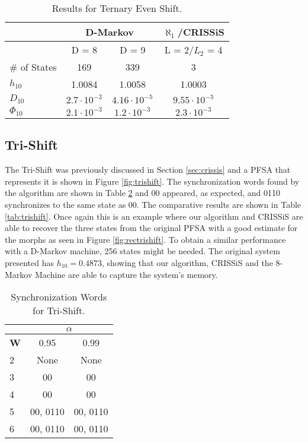 {\begin{table}
\centering
\caption{Results for Ternary Even Shift. \label{tab:ternaryeven}}
\begin{tabular}{|l|c|c|c|}
\hline
 & \multicolumn{2}{c|}{\textbf{D-Markov}} & \textbf{$\aleph_1$/CRISSiS}\\
 \hline
 & D = 8 & D = 9 &  L = 2/$L_2$ = 4 \\
\hline
\# of States & 169 & 339 & 3 \\ 
$h_{10}$ & 1.0084 & 1.0058 & 1.0003 \\
$D_{10}$ & $2.7\cdot10^{-3}$ & $4.16\cdot10^{-5}$ & $9.55\cdot10^{-5}$ \\
$\Phi_{10}$  & $2.1\cdot10^{-3}$ & $1.2\cdot10^{-3}$ & $2.3\cdot10^{-3}$ \\
 \hline
\end{tabular}
\end{table}

\subsection{Tri-Shift}

The Tri-Shift was previously discussed in Section \ref{sec:crissis} and a PFSA that represents it is shown in Figure \ref{fig:trishift}. The synchronization words found by the algorithm are shown in Table \ref{tab:trishiftsynch} and 00 appeared, as expected, and 0110 synchronizes to the same state as 00. The comparative results are shown in Table \ref{tab:trishift}. Once again this is an example where our algorithm and CRISSiS are able to recover the three states from the original PFSA with a good estimate for the morphs as seen in Figure \ref{fig:rectrishift}. To obtain a similar performance with a D-Markov machine, 256 states might be needed. The original system presented has $h_{10} = 0.4873$, showing that our algorithm, CRISSiS and the 8-Markov Machine are able to capture the system's memory.

\begin{table}
\centering
\caption{Synchronization Words for Tri-Shift. \label{tab:trishiftsynch}}
\begin{tabular}{|l|c|c|}
\hline
 & \multicolumn{2}{c|}{\textbf{$\alpha$}}\\
 \hline
\textbf{W} & 0.95 & 0.99 \\
\hline
2 & None & None \\ 
3 & 00 & 00 \\ 
4 & 00 & 00 \\ 
5 & 00, 0110 & 00, 0110 \\
6 & 00, 0110 & 00, 0110 \\
 \hline
\end{tabular}
\end{table}


}
